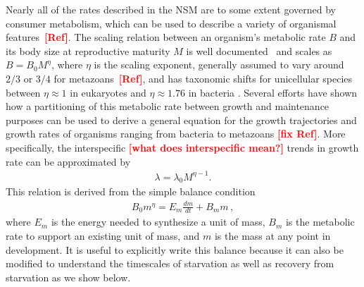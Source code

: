 \documentclass{pnastwo}
\newcommand{\sid}[1]{\textcolor{red}{\bf [#1]}}
\begin{document}
\begin{article}
Nearly all of the rates described in the NSM are to some extent governed by
consumer metabolism, which can be used to describe a variety of organismal
features~\cite{}\sid{Ref}.  The scaling relation between an organism's
metabolic rate $B$ and its body size at reproductive maturity $M$ is well
documented~\cite{West:2002it} and scales as $B = B_0 M^\eta$, where $\eta$ is
the scaling exponent, generally assumed to vary around $2/3$ or $3/4$ for
metazoans~\cite{}\sid{Ref}, and has taxonomic shifts for unicellular species
between $\eta\approx 1$ in eukaryotes and $\eta\approx 1.76$ in bacteria
\cite{DeLong:2010dy,Kempes:2012hy}. Several efforts have shown how a
partitioning of this metabolic rate between growth and maintenance purposes
can be used to derive a general equation for the growth trajectories and
growth rates of organisms ranging from bacteria to metazoans
\cite{Kempes:2012hy,more}\sid{fix Ref}. More specifically, the interspecific
\sid{what does interspecific mean?}  trends in growth rate can be
approximated by
\begin{eqnarray}
\lambda = \lambda_0 M^{\eta-1}.
\label{lambda}
\end{eqnarray}
This relation is derived from the simple balance condition
\begin{eqnarray}
\label{balance}
B_{0}m^{\eta}=E_{m}\frac{dm}{dt}+B_{m}m\,,
\end{eqnarray}
where $E_{m}$ is the energy needed to synthesize a unit of mass, $B_{m}$ is
the metabolic rate to support an existing unit of mass, and $m$ is the mass
at any point in development.  It is useful to explicitly write this balance
because it can also be modified to understand the timescales of starvation as
well as recovery from starvation as we show below.


\end{article}
\end{document}
